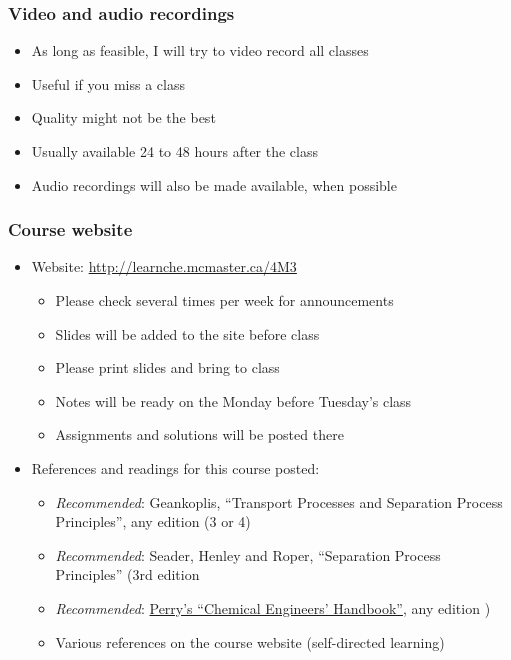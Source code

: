 \begin{frame}\frametitle{Video and audio recordings}
	\begin{itemize}
		\item	As long as feasible, I will try to video record all classes
		\item	Useful if you miss a class
		\item	Quality might not be the best
		\item	Usually available 24 to 48 hours after the class
		\item	Audio recordings will also be made available, when possible
	\end{itemize}
\end{frame}

\begin{frame}\frametitle{Course website}	
	\begin{itemize}
		\item	Website: \href{http://learnche.mcmaster.ca/4M3}{http://learnche.mcmaster.ca/4M3}
			\begin{itemize}
				\item	Please check several times per week for announcements
				\item	Slides will be added to the site before class
				\item	Please print slides and bring to class
				\item	Notes will be ready on the Monday before Tuesday's class
				\item	Assignments and solutions will be posted there
			\end{itemize}
		\item	References and readings for this course posted:
		\begin{itemize}
			\item	\emph{Recommended}: Geankoplis, ``Transport Processes and Separation Process Principles'', any edition (3 or 4)
			\item	\emph{Recommended}: Seader, Henley and Roper, ``Separation Process Principles'' (3rd edition
			\item	\emph{Recommended}: \href{http://accessengineeringlibrary.com/browse/perrys-chemical-engineers-handbook-eighth-edition}{Perry's ``Chemical Engineers' Handbook''}, any edition
)
			\item	Various references on the course website (self-directed learning)
		\end{itemize}
	\end{itemize}
\end{frame}

